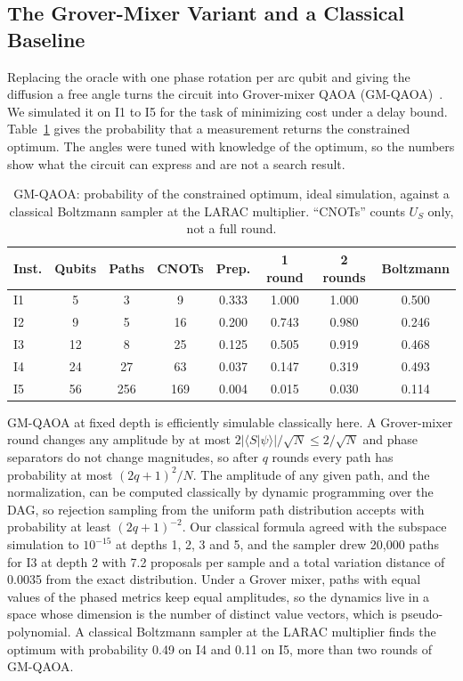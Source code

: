 \documentclass[journal]{IEEEtran}
\begin{document}
\subsection{The Grover-Mixer Variant and a Classical Baseline}

Replacing the oracle with one phase rotation per arc qubit and giving the diffusion a free angle turns the circuit into Grover-mixer QAOA (GM-QAOA)~\cite{baertschi2020}. We simulated it on I1 to I5 for the task of minimizing cost under a delay bound. Table~\ref{tab:phaseonly} gives the probability that a measurement returns the constrained optimum. The angles were tuned with knowledge of the optimum, so the numbers show what the circuit can express and are not a search result.

\begin{table}[t]
\caption{GM-QAOA: probability of the constrained optimum, ideal simulation, against a classical Boltzmann sampler at the LARAC multiplier. ``CNOTs'' counts $U_{S}$ only, not a full round.}
\label{tab:phaseonly}
\centering
\footnotesize
\setlength{\tabcolsep}{2.2pt}
\begin{tabular}{lccccccc}
\hline \hline
\textbf{Inst.} & \textbf{Qubits} & \textbf{Paths} & \textbf{CNOTs} & \textbf{Prep.} & \textbf{1 round} & \textbf{2 rounds} & \textbf{Boltzmann} \\
\hline
I1 & 5 & 3 & 9 & 0.333 & 1.000 & 1.000 & 0.500 \\
I2 & 9 & 5 & 16 & 0.200 & 0.743 & 0.980 & 0.246 \\
I3 & 12 & 8 & 25 & 0.125 & 0.505 & 0.919 & 0.468 \\
I4 & 24 & 27 & 63 & 0.037 & 0.147 & 0.319 & 0.493 \\
I5 & 56 & 256 & 169 & 0.004 & 0.015 & 0.030 & 0.114 \\
\hline \hline
\end{tabular}
\end{table}

GM-QAOA at fixed depth is efficiently simulable classically here. A Grover-mixer round changes any amplitude by at most $2\lvert\langle S\vert\psi\rangle\rvert/\sqrt N\le 2/\sqrt N$ and phase separators do not change magnitudes, so after $q$ rounds every path has probability at most $(2q+1)^{2}/N$. The amplitude of any given path, and the normalization, can be computed classically by dynamic programming over the DAG, so rejection sampling from the uniform path distribution accepts with probability at least $(2q+1)^{-2}$. Our classical formula agreed with the subspace simulation to $10^{-15}$ at depths 1, 2, 3 and 5, and the sampler drew 20{,}000 paths for I3 at depth 2 with 7.2 proposals per sample and a total variation distance of 0.0035 from the exact distribution. Under a Grover mixer, paths with equal values of the phased metrics keep equal amplitudes, so the dynamics live in a space whose dimension is the number of distinct value vectors, which is pseudo-polynomial. A classical Boltzmann sampler at the LARAC multiplier finds the optimum with probability 0.49 on I4 and 0.11 on I5, more than two rounds of GM-QAOA.
\end{document}
